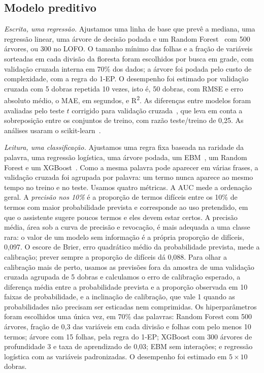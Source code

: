 \documentclass[conference]{IEEEtran}
\newcommand{\RF}{Random Forest}
\newcommand{\Rdois}{R\textsuperscript{2}}
\begin{document}
\subsection{Modelo preditivo}

\emph{Escrita, uma regressão.} Ajustamos uma linha de base que prevê a mediana,
uma regressão linear, uma árvore de decisão podada e um
\RF{}~\cite{breiman2001rf} com 500 árvores, ou 300 no LOFO. O tamanho mínimo
das folhas e a fração de variáveis sorteadas em cada divisão da floresta foram
escolhidos por busca em grade, com validação cruzada interna em 70\% dos dados;
a árvore foi podada pelo custo de complexidade, com a regra do 1-EP. O
desempenho foi estimado por validação cruzada com 5 dobras repetida 10 vezes,
isto é, 50 dobras, com RMSE e erro absoluto médio, o MAE, em segundos, e
\Rdois{}. As diferenças entre modelos foram avaliadas pelo teste $t$ corrigido
para validação cruzada~\cite{nadeau2003inference}, que leva em conta a
sobreposição entre os conjuntos de treino, com razão teste/treino de 0,25. As
análises usaram o scikit-learn~\cite{pedregosa2011sklearn}.

\emph{Leitura, uma classificação.} Ajustamos uma regra fixa baseada na raridade
da palavra, uma regressão logística, uma árvore podada, um
EBM~\cite{lou2013ga2m,nori2019interpretml}, um \RF{} e um
XGBoost~\cite{chen2016xgboost}. Como a mesma palavra pode aparecer em várias
frases, a validação cruzada foi agrupada por palavra: um termo nunca aparece ao
mesmo tempo no treino e no teste. Usamos quatro métricas. A AUC mede a
ordenação geral. A \emph{precisão nos 10\%} é a proporção de termos difíceis
entre os 10\% de termos com maior probabilidade prevista e corresponde ao uso
pretendido, em que o assistente sugere poucos termos e eles devem estar certos.
A precisão média, área sob a curva de precisão e revocação, é mais adequada a
uma classe rara: o valor de um modelo sem informação é a própria proporção de
difíceis, 0,097. O escore de Brier, erro quadrático médio da probabilidade
prevista, mede a calibração; prever sempre a proporção de difíceis dá 0,088.
Para olhar a calibração mais de perto, usamos as previsões fora da amostra de
uma validação cruzada agrupada de 5 dobras e calculamos o erro de calibração
esperado, a diferença média entre a probabilidade prevista e a proporção
observada em 10 faixas de probabilidade, e a inclinação de calibração, que vale
1 quando as probabilidades não precisam ser esticadas nem comprimidas.
Os hiperparâmetros foram escolhidos uma única vez, em 70\% das palavras: \RF{}
com 500 árvores, fração de 0,3 das variáveis em cada divisão e folhas com pelo
menos 10 termos; árvore com 15 folhas, pela regra do 1-EP; XGBoost com 300
árvores de profundidade 3 e taxa de aprendizado de 0,03; EBM sem interações; e
regressão logística com as variáveis padronizadas. O desempenho foi estimado em
$5 \times 10$ dobras.
\end{document}
